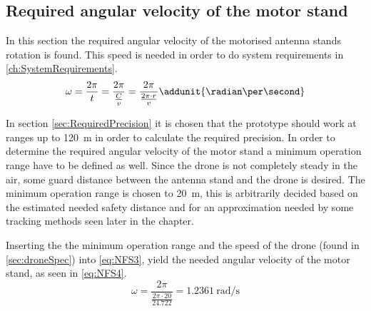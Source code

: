 \subsection{Required angular velocity of the motor stand}\label{sec:NeedForSpeed}
In this section the required angular velocity of the motorised antenna stands rotation is found. This speed is needed in order to do system requirements in \autoref{ch:SystemRequirements}.
\begin{equation} \label{eq:NFS3} 
\omega = \frac{2\pi}{t} = \frac{2\pi}{\frac{C}{v}} = \frac{2\pi}{\frac{2\pi \cdot r}{v}} \addunit{\radian \per \second}
\end{equation}
\startexplain
{}
\stopexplain

In section \autoref{sec:RequiredPrecision} it is chosen that the prototype should work at ranges up to \SI{120}{\meter} in order to calculate the required precision. In order to determine the required angular velocity of the motor stand a minimum operation range have to be defined as well. Since the drone is not completely steady in the air, some guard distance between the antenna stand and the drone is desired. The minimum operation range is chosen to \SI{20}{\meter}, this is arbitrarily decided based on the estimated needed safety distance and for an approximation needed by some tracking methods seen later in the chapter.  


Inserting the the minimum operation range and the speed of the drone (found in \autoref{sec:droneSpec}) into \autoref{eq:NFS3}, yield the needed angular velocity of the motor stand, as seen in \autoref{eq:NFS4}. 
\begin{equation} \label{eq:NFS4} 
\omega = \frac{2\pi}{\frac{2\pi \cdot 20}{24.722}} = \SI{1.2361}{\radian \per \second}
\end{equation}